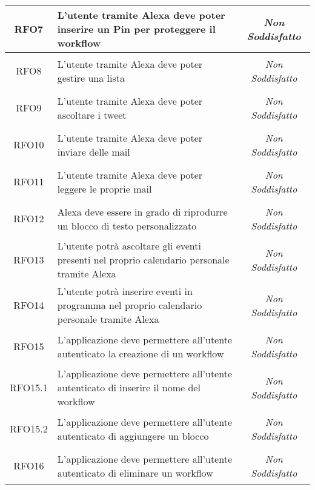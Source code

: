 \begin{longtable}{|c|>{\centering}m{7cm}|c|}
	\hypertarget{RFO7}{RFO7} & L'utente tramite Alexa deve poter inserire un Pin per proteggere il workflow & \textit{Non Soddisfatto}\\ \hline
	
	\hypertarget{RFO8}{RFO8} & L'utente tramite Alexa deve poter gestire una lista & \textit{Non Soddisfatto}\\ \hline
	
	\hypertarget{RFO9}{RFO9} & L'utente tramite Alexa deve poter ascoltare i tweet & \textit{Non Soddisfatto}\\ \hline
	
	\hypertarget{RFO10}{RFO10} & L'utente tramite Alexa deve poter inviare delle mail & \textit{Non Soddisfatto}\\ \hline
	
	\hypertarget{RFO11}{RFO11} & L'utente tramite Alexa deve poter leggere le proprie mail & \textit{Non Soddisfatto}\\ \hline
	
	\hypertarget{RFO12}{RFO12} & Alexa deve essere in grado di riprodurre un blocco di testo personalizzato & \textit{Non Soddisfatto}\\ \hline
	
	\hypertarget{RFO13}{RFO13} & L'utente potrà ascoltare gli eventi presenti nel proprio calendario personale tramite Alexa & \textit{Non Soddisfatto}\\ \hline
	
	\hypertarget{RFO14}{RFO14} & L'utente potrà inserire eventi in programma nel proprio calendario personale tramite Alexa & \textit{Non Soddisfatto}\\ \hline
	
	\hypertarget{RFO15}{RFO15} & L'applicazione deve permettere all'utente autenticato la creazione di un workflow & \textit{Non Soddisfatto}\\ \hline
	
	\hypertarget{RFO15.1}{RFO15.1} & L'applicazione deve permettere all'utente autenticato di inserire il nome del workflow & \textit{Non Soddisfatto}\\ \hline
	
	\hypertarget{RFO15.2}{RFO15.2} & L'applicazione deve permettere all'utente autenticato di aggiungere un blocco & \textit{Non Soddisfatto}\\ \hline
	
	\hypertarget{RFO16}{RFO16} & L'applicazione deve permettere all'utente autenticato di eliminare un workflow & \textit{Non Soddisfatto}\\ \hline
	

\end{longtable}
